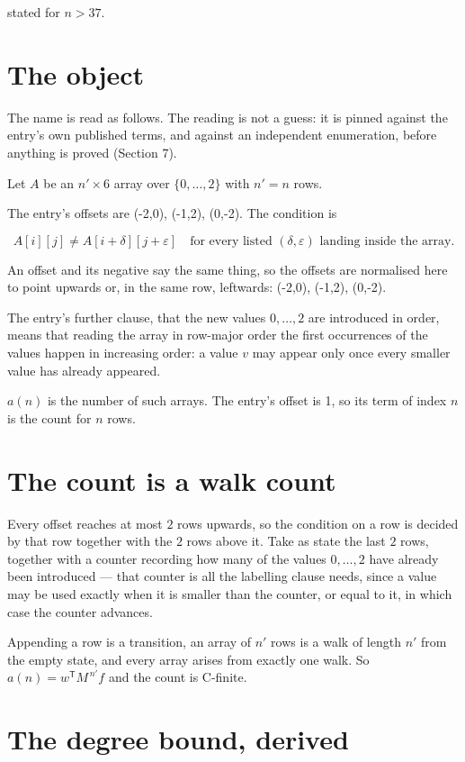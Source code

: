 \documentclass[11pt]{article}
\theoremstyle{definition}
\begin{document}
stated for $n > 37$.

\section{The object}

The name is read as follows. The reading is not a guess: it is pinned against the entry's own published terms, and against an independent enumeration, before anything is proved (Section 7).

Let $A$ be an $n' \times 6$ array over $\{0,\dots,2\}$ with $n' = n$ rows.

The entry's offsets are (-2,0), (-1,2), (0,-2). The condition is

\[A[i][j] \ne A[i{+}\delta][j{+}\varepsilon]\quad\text{for every listed }(\delta,\varepsilon)\text{ landing inside the array.}\]

An offset and its negative say the same thing, so the offsets are normalised here to point upwards or, in the same row, leftwards: (-2,0), (-1,2), (0,-2).

The entry's further clause, that the new values $0,\dots,2$ are introduced in order, means that reading the array in row-major order the first occurrences of the values happen in increasing order: a value $v$ may appear only once every smaller value has already appeared.

$a(n)$ is the number of such arrays. The entry's offset is 1, so its term of index $n$ is the count for $n$ rows.

\section{The count is a walk count}

Every offset reaches at most $2$ rows upwards, so the condition on a row is decided by that row together with the $2$ rows above it. Take as state the last $2$ rows, together with a counter recording how many of the values $0,\dots,2$ have already been introduced --- that counter is all the labelling clause needs, since a value may be used exactly when it is smaller than the counter, or equal to it, in which case the counter advances.

Appending a row is a transition, an array of $n'$ rows is a walk of length $n'$ from the empty state, and every array arises from exactly one walk. So $a(n) = w^{\mathsf T}M^{\,n'}f$ and the count is C-finite.

\section{The degree bound, derived}
\end{document}
